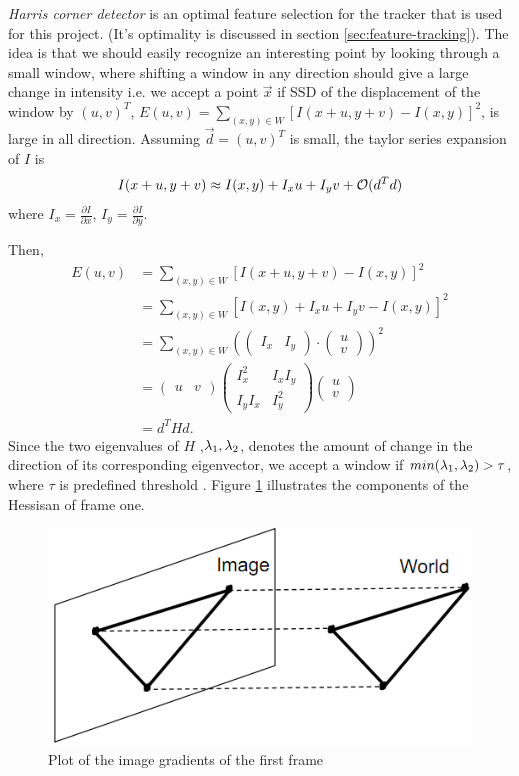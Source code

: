 \emph{Harris corner detector} is an optimal feature selection for the
tracker that is used for this project. (It's optimality is discussed
in section \ref{sec:feature-tracking}). The idea is that we should easily recognize an interesting point by looking through a
small window, where shifting a window in any direction
should give a large change in intensity i.e. we accept a point $\vec x$ if SSD of
the displacement of the window by $(u,v)^T$, $E(u,v) =
\sum_{(x,y)\in W} [I(x+u, y+v) - I(x,y)]^2$, is large in all
direction. 
Assuming $\vec d = (u,v)^T$ is small, the taylor series expansion of $I$ is
$$I(x+u, y+v) \approx I(x,y) + I_xu +I_yv + \mathcal{O}(d^Td)$$ where $I_x
=\frac{\partial I}{\partial x} $, $I_y = \frac{\partial I}{\partial y}$.

Then, 
\begin{align*}
  E(u,v) &=\sum_{(x,y)\in W} [I(x+u, y+v) - I(x,y)]^2\\
&=\sum_{(x,y)\in W} [I(x,y) + I_xu +
I_yv - I(x,y)]^2\\
&= \sum_{(x,y)\in W} (
\begin{pmatrix}
  I_x & I_y
\end{pmatrix}
\cdot
\begin{pmatrix}
  u \\ v
\end{pmatrix}
)^2\\
&= \begin{pmatrix}
  u & v
\end{pmatrix} 
\begin{pmatrix}  I_x^2
  & I_xI_y \\ I_yI_x & I_y^2\end{pmatrix} \begin{pmatrix}
  u \\ v
\end{pmatrix}\\
&=d^T H d.
\end{align*}
  Since the two eigenvalues of $H$
,$\lambda_1, \lambda_2$, denotes the amount of change in the direction of its corresponding
eigenvector, we accept a window if $min(\lambda_1, \lambda_2) > \tau$, where
$\tau$ is predefined threshold \cite{shi}. Figure \ref{fig:Hessian} illustrates
the components of the Hessisan of frame one. 

\begin{figure}[!ht]
  \begin{center}
  \includegraphics[scale=0.5]{ortho.png}
  \caption{Plot of the image gradients of the first frame} 
  \label{fig:Hessian}
  \end{center}
\end{figure}

